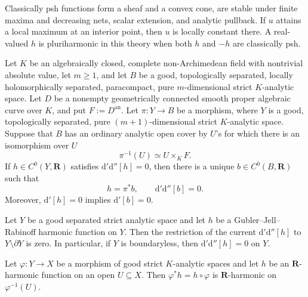 \begin{proposition}
\label{prop:classical-psh-calculus}
Classically psh functions form a sheaf and a convex cone, are stable under
finite maxima and decreasing nets, scalar extension, and analytic pullback.
If $u$ attains a local maximum at an interior point, then $u$ is locally
constant there.  A real-valued $h$ is pluriharmonic in this theory when
both $h$ and $-h$ are classically psh.
\end{proposition}

\begin{proposition}
\label{prop:p062-proper-smooth-curve-bundle-descent}
Let $K$ be an algebraically closed, complete non-Archimedean field with
nontrivial absolute value, let $m\geq1$, and let $B$ be a good,
topologically separated, locally holomorphically separated, paracompact,
pure $m$-dimensional strict $K$-analytic space.  Let $D$ be a nonempty
geometrically connected smooth proper algebraic curve over $K$, and put
$F:=D^{\mathrm{an}}$.  Let $\pi:Y\to B$ be a morphism, where $Y$ is a
good, topologically separated, pure $(m+1)$-dimensional strict
$K$-analytic space.  Suppose that $B$ has an ordinary analytic open cover
by $U$'s for which there is an isomorphism over $U$
\[
                         \pi^{-1}(U)\simeq U\times_KF.
\]
If $h\in C^0(Y,\mathbf R)$ satisfies
$\mathrm d'\mathrm d''[h]=0$, then there is a unique
$b\in C^0(B,\mathbf R)$ such that
\[
                         h=\pi^*b,
                         \qquad
                         \mathrm d'\mathrm d''[b]=0.
\]
Moreover, $\mathrm d'[h]=0$ implies $\mathrm d'[b]=0$.
\end{proposition}

\begin{corollary}
\label{cor:p213-gjr-harmonic-zero-current}
Let $Y$ be a good separated strict analytic space and let $h$ be a
Gubler--Jell--Rabinoff harmonic function on $Y$.  Then the restriction of
the current $\mathrm d'\mathrm d''[h]$ to $Y\setminus\partial Y$ is zero.
In particular, if $Y$ is boundaryless, then
$\mathrm d'\mathrm d''[h]=0$ on $Y$.
\end{corollary}

\begin{proposition}
\label{prop:ch18-harmonic-functorial}
Let $\varphi:Y\to X$ be a morphism of good strict $K$-analytic spaces and
let $h$ be an $\mathbf R$-harmonic function on an open $U\subseteq X$.
Then $\varphi^*h=h\circ\varphi$ is $\mathbf R$-harmonic on
$\varphi^{-1}(U)$.
\end{proposition}

